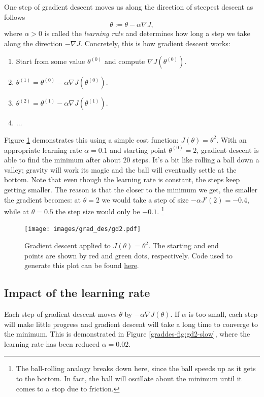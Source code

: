 \documentclass{article}
\theoremstyle{definition}
\begin{document}
One step of gradient descent moves us along the direction of steepest descent as follows
\begin{equation}
    \theta := \theta - \alpha \nabla J,
\end{equation}
where $\alpha > 0$ is called the \textit{learning rate} and determines how long a step we take along the direction $-\nabla J$. Concretely, this is how gradient descent works:
\begin{enumerate}
    \item Start from some value $\theta^{(0)}$ and compute $\nabla J(\theta^{(0)})$.
    \item $\theta^{(1)}=\theta^{(0)}-\alpha\nabla J(\theta^{(0)})$.
    \item $\theta^{(2)}=\theta^{(1)}-\alpha\nabla J(\theta^{(1)})$.
    \item $\dots$
\end{enumerate}
Figure \ref{graddes-fig:gd2} demonstrates this using a simple cost function: $J(\theta)=\theta^2$. With an appropriate learning rate $\alpha=0.1$ and starting point $\theta^{(0)}=2$, gradient descent is able to find the minimum after about $20$ steps. It's a bit like rolling a ball down a valley; gravity will work its magic and the ball will eventually settle at the bottom. Note that even though the learning rate is constant, the steps keep getting smaller. The reason is that the closer to the minimum we get, the smaller the gradient becomes: at $\theta = 2$ we would take a step of size $-\alpha J'(2) = -0.4$, while at $\theta = 0.5$ the step size would only be $-0.1$.
\footnote{
The ball-rolling analogy breaks down here, since the ball speeds up as it gets to the bottom. In fact, the ball will oscillate about the minimum until it comes to a stop due to friction.
}


\begin{figure}[ht]
\centering
\texttt{[image: images/grad\_des/gd2.pdf]}
\caption{Gradient descent applied to $J(\theta)=\theta^2$. The starting and end points are shown by red and green dots, respectively. Code used to generate this plot can be found \href{https://github.com/siavashaslanbeigi/ml_notes/blob/master/src/grad_des/basics.ipynb}{\color{blue} here}.}
\label{graddes-fig:gd2}
\end{figure}


\subsection{Impact of the learning rate}
Each step of gradient descent moves $\theta$ by $-\alpha\nabla J(\theta)$. If $\alpha$ is too small, each step will make little progress and gradient descent will take a long time to converge to the minimum. This is demonstrated in Figure \ref{graddes-fig:gd2-slow}, where the learning rate has been reduced $\alpha=0.02$.
\end{document}
